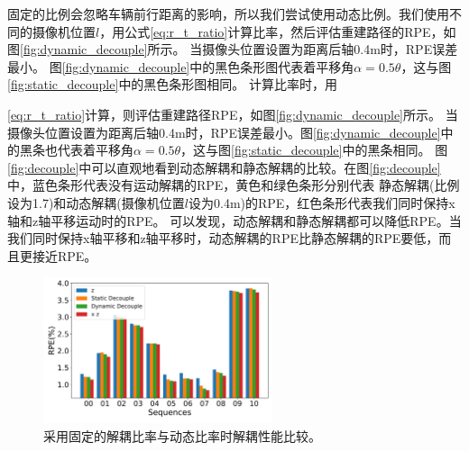 固定的比例会忽略车辆前行距离的影响，所以我们尝试使用动态比例。我们使用不同的摄像机位置$l$，用公式\eqref{eq:r_t_ratio}计算比率，然后评估重建路径的RPE，如图\ref{fig:dynamic_decouple}所示。
当摄像头位置设置为距离后轴0.4m时，RPE误差最小。
图\ref{fig:dynamic_decouple}中的黑色条形图代表着平移角$\alpha=0.5\theta$，这与图\ref{fig:static_decouple}中的黑色条形图相同。
计算比率时，用{\eqref{eq:r_t_ratio}计算，则评估重建路径RPE，如图\ref{fig:dynamic_decouple}所示。
当摄像头位置设置为距离后轴0.4m时，RPE误差最小。图\ref{fig:dynamic_decouple}中的黑条也代表着平移角$\alpha=0.5\theta$，这与图\ref{fig:static_decouple}中的黑条相同。
图\ref{fig:decouple}中可以直观地看到动态解耦和静态解耦的比较。{在图\ref{fig:decouple}中，蓝色条形代表没有运动解耦的RPE，黄色和绿色条形分别代表
静态解耦(比例设为1.7)和动态解耦(摄像机位置$l$设为0.4m)的RPE，红色条形代表我们同时保持x轴和z轴平移运动时的RPE}。
可以发现，动态解耦和静态{解耦}都可以降低RPE。当我们同时保持x轴平移和z轴平移时，动态{解耦}的RPE比静态{解耦}的RPE要低，而且更接近RPE。
\begin{figure}[ht]
    \centering
    \includegraphics[width=0.6\textwidth]{datavo/decouple-crop.pdf}
    \caption{采用固定的解耦比率与动态比率时解耦性能比较。}
\end{figure}
}
